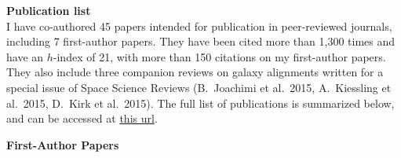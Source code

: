 \documentclass{article}
\begin{document}
% 

\noindent
{\bf\huge Publication list}\\

\noindent
I have co-authored 45 papers intended for publication in peer-reviewed journals, 
including 7 first-author papers. They have been cited more than 1,300 times and 
have an $h$-index of 21, with more than 150 citations on my first-author papers. 
They also include three companion reviews on galaxy alignments written for a 
special issue of Space Science Reviews (B.\ Joachimi et al.\ 2015, A.\ Kiessling 
et al.\ 2015, D.\ Kirk et al.\ 2015). The full list of publications is summarized 
below, and can be accessed at \href{https://goo.gl/LAu9G4}{this url}.

\vspace{0.4cm}
\noindent
{\bf\Large First-Author Papers}\\

\newcommand{\etal}[1]{et al.\ (#1 co-authors),}
\end{document}
